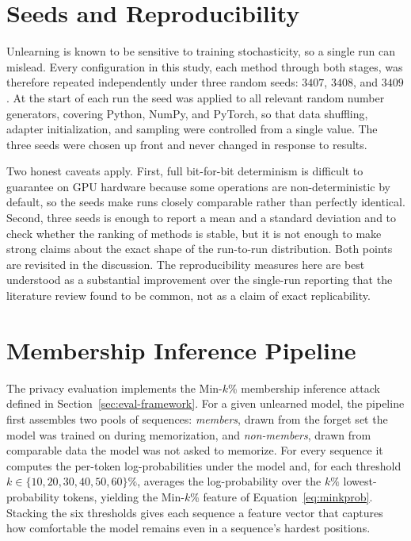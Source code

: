 \documentclass[a4paper,12pt]{report}
\begin{document}
\section{Seeds and Reproducibility}
Unlearning is known to be sensitive to training stochasticity, so a single run can mislead. Every configuration in this study, each method through both stages, was therefore repeated independently under three random seeds: $3407$, $3408$, and $3409$. At the start of each run the seed was applied to all relevant random number generators, covering Python, NumPy, and PyTorch, so that data shuffling, adapter initialization, and sampling were controlled from a single value. The three seeds were chosen up front and never changed in response to results.

Two honest caveats apply. First, full bit-for-bit determinism is difficult to guarantee on GPU hardware because some operations are non-deterministic by default, so the seeds make runs closely comparable rather than perfectly identical. Second, three seeds is enough to report a mean and a standard deviation and to check whether the ranking of methods is stable, but it is not enough to make strong claims about the exact shape of the run-to-run distribution. Both points are revisited in the discussion. The reproducibility measures here are best understood as a substantial improvement over the single-run reporting that the literature review found to be common, not as a claim of exact replicability.

\section{Membership Inference Pipeline}
\label{sec:setup-mia}
The privacy evaluation implements the Min-$k$\% membership inference attack defined in Section~\ref{sec:eval-framework}. For a given unlearned model, the pipeline first assembles two pools of sequences: \emph{members}, drawn from the forget set the model was trained on during memorization, and \emph{non-members}, drawn from comparable data the model was not asked to memorize. For every sequence it computes the per-token log-probabilities under the model and, for each threshold $k \in \{10, 20, 30, 40, 50, 60\}\%$, averages the log-probability over the $k\%$ lowest-probability tokens, yielding the Min-$k$\% feature of Equation~\eqref{eq:minkprob}. Stacking the six thresholds gives each sequence a feature vector that captures how comfortable the model remains even in a sequence's hardest positions.
\end{document}
